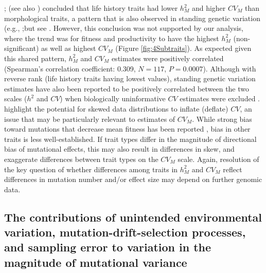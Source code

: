 \citet{Houl96}; (see also \citealp{Lync98,Lync99}) concluded that life history traits had lower $h_M^2$ and higher $CV_M$ than morphological traits, a pattern that is also observed in standing genetic variation (e.g., \citealp{Houl92a,Hans11};but see \citealp{Hoff16}. However, this conclusion was not supported by our analysis, where the trend was for fitness and productivity to have the highest $h_M^2$ (non-significant) as well as highest $CV_M$ (Figure \ref{fig:4Subtraits}). As expected given this shared pattern, $h_M^2$ and $CV_M$ estimates were positively correlated (Spearman’s correlation coefficient: 0.309, $N =117$, $P = 0.0007$). Although with reverse rank (life history traits having lowest values), standing genetic variation estimates have also been reported to be positively correlated between the two scales ($h^2$ and $CV$) when biologically uninformative $CV$ estimates were excluded \citep{Hoff16}. \citet{Garc12} highlight the potential for skewed data distributions to inflate (deflate) $CV$, an issue that may be particularly relevant to estimates of $CV_M$. While strong bias toward mutations that decrease mean fitness has been reported \citep{Hall09}, bias in other traits is less well-established. If trait types differ in the magnitude of directional bias of mutational effects, this may also result in differences in skew, and exaggerate differences between trait types on the $CV_M$ scale. Again, resolution of the key question of whether differences among traits in $h_M^2$ and $CV_M$ reflect differences in mutation number and/or effect size may depend on further genomic data.\par 

\subsection{The contributions of unintended environmental variation, mutation-drift-selection processes, and sampling error to variation in the magnitude of mutational variance}

